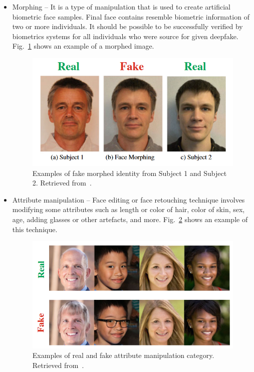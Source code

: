 \begin{itemize}
\item Morphing – It is a type of manipulation that is used to create artificial biometric face samples. Final face contains resemble biometric information of two or more individuals. It should be possible to be successfully verified by biometrics systems for all individuals who were source for given deepfake. Fig.~\ref{fig:morphing} shows an example of a morphed image.
\begin{figure}[H]
    \centering
    \includegraphics[width=.45\linewidth]{other-fig/morphing.png}
    \caption{Examples of fake morphed identity from Subject 1 and Subject 2. Retrieved from~\cite{IntroductionToDigitalFaceManipulation}.}
\label{fig:morphing}
\end{figure}

\item Attribute manipulation – Face editing or face retouching technique involves modifying some attributes such as length or color of hair, color of skin, sex, age, adding glasses or other artefacts, and more. Fig.~\ref{fig:attribute_manipulation} shows an example of this technique.
\begin{figure}[H]
    \centering
    \includegraphics[width=.52\linewidth]{other-fig/attribute_manipulation.png}
    \caption{Examples of real and fake attribute manipulation category. Retrieved from~\cite{IntroductionToDigitalFaceManipulation}.}
\label{fig:attribute_manipulation}
\end{figure}


\end{itemize}
